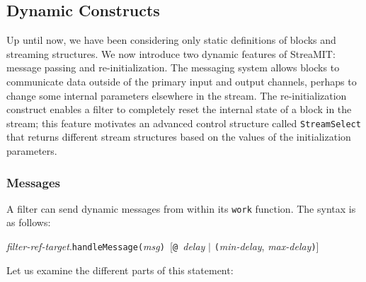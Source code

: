 \documentclass[draft]{article}
\begin{document}
\subsection{Dynamic Constructs}
\protect\label{sec:dynamic}

Up until now, we have been considering only static definitions of
blocks and streaming structures.  We now introduce two dynamic
features of StreaMIT: message passing and re-initialization.  The
messaging system allows blocks to communicate data outside of the
primary input and output channels, perhaps to change some internal
parameters elsewhere in the stream.  The re-initialization construct
enables a filter to completely reset the internal state of a block in
the stream; this feature motivates an advanced control structure
called {\tt StreamSelect} that returns different stream structures
based on the values of the initialization parameters.

\subsubsection{Messages}

A filter can send dynamic messages from within its {\tt work}
function.  The syntax is as follows:

\medskip
{\it filter-ref-target}.{\tt handleMessage(}{\it msg}{\tt) }[{\tt @ }{\it delay} $|$ {\tt (}{\it min-delay}, {\it max-delay}{\tt )}]
\medskip

Let us examine the different parts of this statement:
\end{document}
